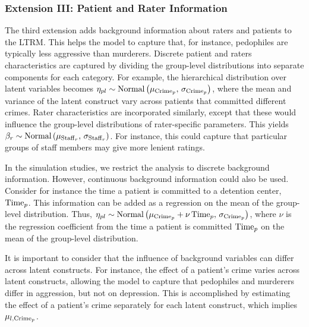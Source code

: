 \documentclass[a4paper]{article}
\begin{document}
\subsubsection*{Extension III: Patient and Rater Information}
The third extension adds background information about raters and patients to the LTRM. This helps the model to capture that, for instance, pedophiles are typically less aggressive than murderers. Discrete patient and raters characteristics are captured by dividing the group-level distributions into separate components for each category. For example, the hierarchical distribution over latent variables becomes $\eta_{pl} \sim \text{Normal}\left(\mu_{\mathrm{Crime}_p},\,\sigma_{\mathrm{Crime}_p}\right)$, where the mean and variance of the latent construct vary across patients that committed different crimes. Rater characteristics are incorporated similarly, except that these would influence the group-level distributions of rater-specific parameters. This yields $\beta_r \sim \text{Normal}\left(\mu_{\mathrm{Staff}_r},\,\sigma_{\mathrm{Staff}_r}\right)$. For instance, this could capture that particular groups of staff members may give more lenient ratings.

In the simulation studies, we restrict the analysis to discrete background information. However, continuous background information could also be used. Consider for instance the time a patient is committed to a detention center, $\mathrm{Time}_p$.  This information can be added as a regression on the mean of the group-level distribution. Thus, $\eta_{pl} \sim \text{Normal}\left(\mu_{\mathrm{Crime}_p} + \nu\,\mathrm{Time}_p,\,\sigma_{\mathrm{Crime}_p}\right)$, where $\nu$ is the regression coefficient from the time a patient is committed $\mathrm{Time}_p$ on the mean of the group-level distribution.

It is important to consider that the influence of background variables can differ across latent constructs. For instance, the effect of a patient's crime varies across latent constructs, allowing the model to capture that pedophiles and murderers differ in aggression, but not on depression. This is accomplished by estimating the effect of a patient's crime separately for each latent construct, which implies $\mu_{l, \mathrm{Crime}_p}$.
\end{document}
